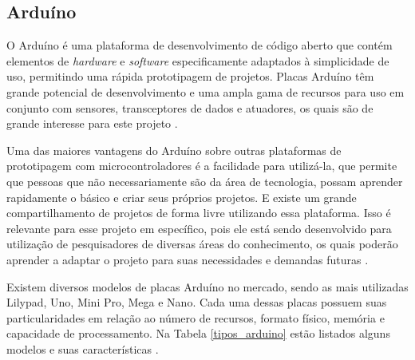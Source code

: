 	
	

\subsection{Arduíno}

O Arduíno é uma plataforma de desenvolvimento de código aberto que contém elementos de \textit{hardware} e \textit{software} especificamente adaptados à simplicidade de uso, permitindo uma rápida prototipagem de projetos. Placas Arduíno têm grande potencial de desenvolvimento e uma ampla gama de recursos para uso em conjunto com sensores, transceptores de dados e atuadores, os quais são de grande interesse para este projeto \cite{smith2016}.

Uma das maiores vantagens do Arduíno sobre outras plataformas de prototipagem com microcontroladores é a facilidade para utilizá-la, que permite que pessoas que não necessariamente são da área de tecnologia, possam aprender rapidamente o básico e criar seus próprios projetos. E existe um grande compartilhamento de projetos de forma livre utilizando essa plataforma. Isso é relevante para esse projeto em específico, pois ele está sendo desenvolvido para utilização de pesquisadores de diversas áreas do conhecimento, os quais poderão aprender a adaptar o projeto para suas necessidades e demandas futuras \cite{arduino2011}.

Existem diversos modelos de placas Arduíno no mercado, sendo as mais utilizadas Lilypad, Uno, Mini Pro, Mega e Nano. Cada uma dessas placas possuem suas particularidades em relação ao número de recursos, formato físico, memória e capacidade de processamento. Na Tabela \ref{tipos_arduino} estão listados alguns modelos e suas características \cite{smith2016}.


